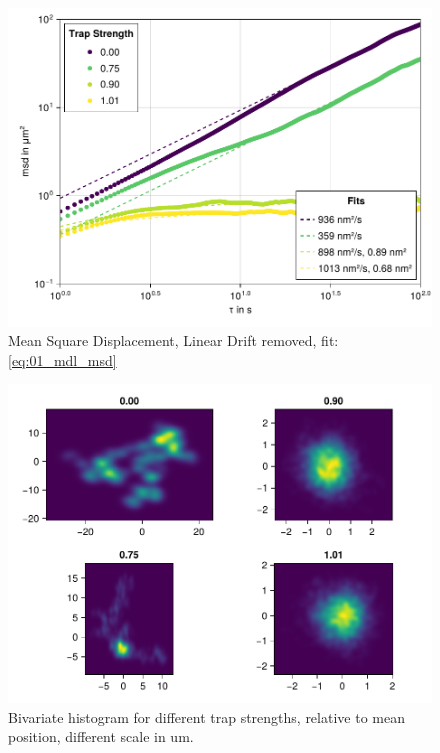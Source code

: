 \documentclass[
    parskip=half, 
    twoside=false,
    twocolumn=true,
    fontsize=11pt,
]{scrarticle}
\begin{document}
\begin{figure}[h]
    \centering
    \includegraphics{figures/01_02_2_msd.pdf}
    \caption{Mean Square Displacement, Linear Drift removed, fit: \autoref{eq:01_mdl_msd}}
\end{figure}

\begin{figure}[h]
    \centering
    \includegraphics{figures/01_03_1_bivariate.pdf}
    \caption{Bivariate histogram for different trap strengths, relative to mean position, different scale in um.}
\end{figure}
\end{document}
